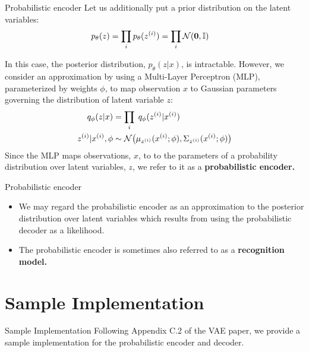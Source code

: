 \documentclass[10pt]{beamer}
\newcommand{\alatent}{z^{(i)} }
\newcommand{\N}{\mathcal{N}}
\newcommand{\I}{\mathbb{I}}
\begin{document}
\begin{frame}{Probabilistic encoder}
Let us additionally put a prior distribution on the latent variables:
\begin{align*}
p_\theta(z) &= \ds\prod_i  p_\theta(\alatent) = \ds\prod_i  \N(\+0, \I) 
\end{align*}


In this case, the posterior distribution, $p_
\theta(z| x)$, is intractable.  However, we consider an approximation 
by using a Multi-Layer Perceptron (MLP), parameterized by weights $\phi$, to map observation $x$ to Gaussian parameters governing the distribution of latent variable $z$: 
\begin{align}
 q_\phi(z| x) &=  \ds\prod_i \; q_\phi(\alatent| x^{(i)}) \nonumber \\
\alatent| x^{(i)}, \phi &\sim \N \big(\mu_{\alatent} (x^{(i)}; \phi), \Sigma_{\alatent} (x^{(i)}; \phi) \big) \label{approx_posterior} 
\end{align}
 Since the MLP maps observations, $x$, to to the parameters of a probability distribution over latent variables, $z$, we refer to it as a \bf{probabilistic encoder.} 
 
\end{frame}

\begin{frame}{Probabilistic encoder} 

\begin{itemize}
\item  We may regard the probabilistic encoder as an approximation to the posterior distribution over latent variables which
results from using the probabilistic decoder as a likelihood.
\item The probabilistic encoder is sometimes also referred to as a \bf{recognition model}.
\end{itemize}

\end{frame}

\section{Sample Implementation}

\begin{frame}{Sample Implementation}
Following Appendix C.2 of the VAE paper, we provide a sample implementation for the probabilistic encoder and decoder. 
\end{frame}
\end{document}
